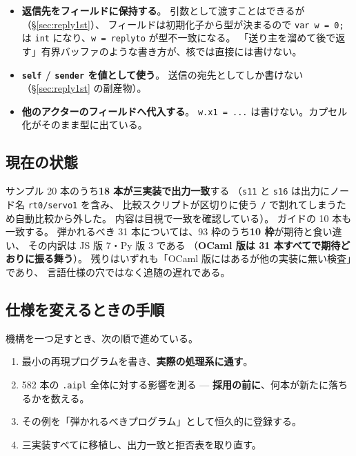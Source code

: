 \documentclass[11pt,a4paper]{ltjsarticle}
\theoremstyle{definition}
\theoremstyle{remark}
\begin{document}
\begin{itemize}
\item \textbf{返信先をフィールドに保持する}。
      引数として渡すことはできるが（\S\ref{sec:reply1st}）、
      フィールドは初期化子から型が決まるので
      \texttt{var w = 0;} は \texttt{int} になり、\texttt{w = replyto} が型不一致になる。
      「送り主を溜めて後で返す」有界バッファのような書き方が、核では直接には書けない。
\item \textbf{\texttt{self} / \texttt{sender} を値として使う}。
      送信の宛先としてしか書けない（\S\ref{sec:reply1st} の副産物）。
\item \textbf{他のアクターのフィールドへ代入する}。
      \texttt{w.x1 = ...} は書けない。カプセル化がそのまま型に出ている。
\end{itemize}

\subsection{現在の状態}

サンプル 20 本のうち\textbf{18 本が三実装で出力一致}する
（\texttt{s11} と \texttt{s16} は出力にノード名 \texttt{rt0/servo1} を含み、
比較スクリプトが区切りに使う \texttt{/} で割れてしまうため自動比較から外した。
内容は目視で一致を確認している）。
ガイドの 10 本も一致する。
弾かれるべき 31 本については、93 枠のうち\textbf{10 枠}が期待と食い違い、
その内訳は JS 版 7・Py 版 3 である
（\textbf{OCaml 版は 31 本すべてで期待どおりに振る舞う}）。
残りはいずれも「OCaml 版にはあるが他の実装に無い検査」であり、
言語仕様の穴ではなく追随の遅れである。

\subsection{仕様を変えるときの手順}

機構を一つ足すとき、次の順で進めている。

\begin{enumerate}
\item 最小の再現プログラムを書き、\textbf{実際の処理系に通す}。
\item 582 本の \texttt{.aipl} 全体に対する影響を測る ---
      \textbf{採用の前に}、何本が新たに落ちるかを数える。
\item その例を「弾かれるべきプログラム」として恒久的に登録する。
\item 三実装すべてに移植し、出力一致と拒否表を取り直す。
\end{enumerate}
\end{document}
